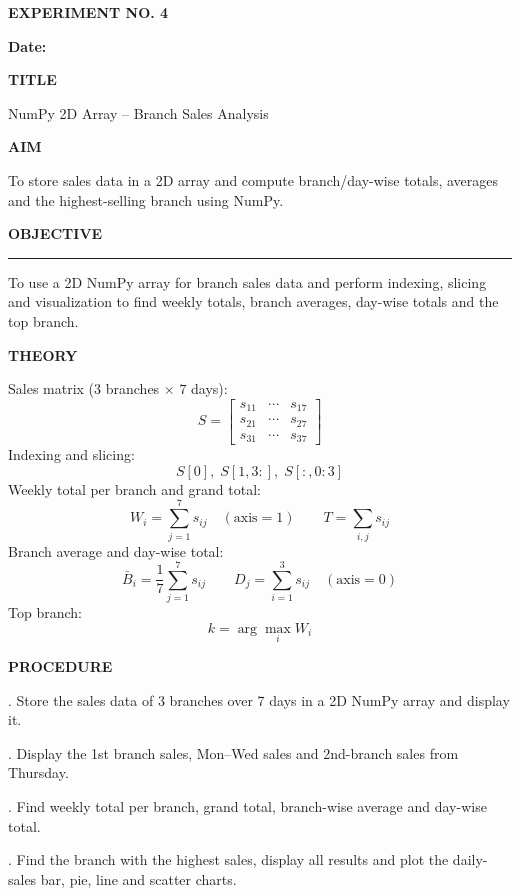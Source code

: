 \documentclass[11pt,twoside]{article}
\newcommand{\expheading}[1]{{\fontsize{14}{17}\selectfont\textbf{#1}\par}}
\newcommand{\fullrule}{\noindent\rule{\textwidth}{0.6pt}\par}
\begin{document}
\sloppy

{\setlength{\parskip}{1pt}\setlength{\abovedisplayskip}{2pt}\setlength{\belowdisplayskip}{2pt}
\begin{center}
\expheading{EXPERIMENT NO. 4}
\end{center}
\vspace{2pt}

\noindent\textbf{Date:} \underline{\hspace{2.6cm}}\par
\vspace{6pt}

\expheading{TITLE}
\vspace{4pt}
\noindent NumPy 2D Array -- Branch Sales Analysis\par
\vspace{4pt}

\expheading{AIM}
\vspace{4pt}
\noindent To store sales data in a 2D array and compute branch/day-wise totals, averages and the highest-selling branch using NumPy. \par
\vspace{4pt}

\expheading{OBJECTIVE}
\vspace{2pt}
\fullrule
\vspace{4pt}
\noindent To use a 2D NumPy array for branch sales data and perform indexing, slicing and visualization to find weekly totals, branch averages, day-wise totals and the top branch. \par
\vspace{4pt}

\expheading{THEORY}
\vspace{4pt}
Sales matrix ($3$ branches $\times$ $7$ days):
\[S=\begin{bmatrix}s_{11} & \cdots & s_{17}\\s_{21} & \cdots & s_{27}\\s_{31} & \cdots & s_{37}\end{bmatrix}\]
Indexing and slicing:
\[S[0],\; S[1,3:],\; S[:,0:3]\]
Weekly total per branch and grand total:
\[W_i=\sum_{j=1}^{7}s_{ij}\quad(\text{axis}=1)\qquad T=\sum_{i,j}s_{ij}\]
Branch average and day-wise total:
\[\bar{B}_i=\frac{1}{7}\sum_{j=1}^{7}s_{ij}\qquad D_j=\sum_{i=1}^{3}s_{ij}\quad(\text{axis}=0)\]
Top branch:
\[k=\arg\max_i W_i\]
\vspace{4pt}

\expheading{PROCEDURE}
\vspace{4pt}
. Store the sales data of 3 branches over 7 days in a 2D NumPy array and display it.\par
{}. Display the 1st branch sales, Mon--Wed sales and 2nd-branch sales from Thursday.\par
{}. Find weekly total per branch, grand total, branch-wise average and day-wise total.\par
{}. Find the branch with the highest sales, display all results and plot the daily-sales bar, pie, line and scatter charts. \par
\vspace{4pt}

}
\end{document}
